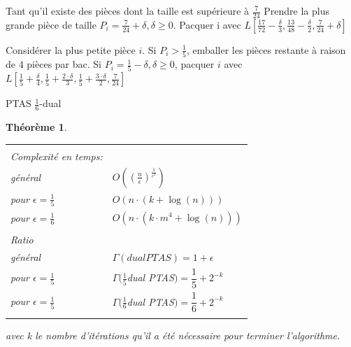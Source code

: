 \documentclass[a4paper,12pt]{report}
\theoremstyle{plain}				%
\newtheorem{theoreme}{Théorème}	%
\theoremstyle{definition}				%
\begin{document}
\begin{algorithm}[H]
Tant qu'il existe des pièces dont la taille est supérieure à $\frac{7}{24}$
Prendre la plus grande pièce de taille $P_i = \frac{7}{24}+\delta, \delta \geq 0$.
Pacquer i avec
$L[\frac{17}{72}-\frac{\delta}{3},
   \frac{13}{48}-\frac{\delta}{2},
   \frac{7}{24}+\delta]$

Considérer la plus petite pièce $i$.
Si $P_i>\frac{1}{5}$, emballer les pièces restante à raison de $4$ pièces par bac.
Si $P_i=\frac{1}{5}-\delta, \delta \geq 0$, pacquer $i$ avec
$L[\frac{1}{5}+\frac{\delta}{4},
   \frac{1}{5}+\frac{2 \cdot \delta}{3},
   \frac{1}{5}+\frac{3 \cdot \delta}{2},
   \frac{7}{24}]$

\BlankLine %



\caption{PTAS $\frac{1}{6}$-dual}
\label{algo:PTASDual1_6}
\end{algorithm}

\bigskip

\begin{theoreme}
\begin{flushleft}
\begin{tabular}{|p{8cm}p{6cm}|}
\hline
& \\
Complexité en temps:& \\
général&
	$ O(( \frac{n}{\epsilon})^\frac{1}{\epsilon ^ 2})$\\
pour $ \epsilon = \frac{1}{5}$ &
	$O(n \cdot (k + \log(n)))$ \\
pour $ \epsilon = \frac{1}{6}$ &
	$O(n \cdot (k \cdot m^4 + \log(n)))$

\\	%
& \\
Ratio & \\
général &
	$\Gamma(dual PTAS) = 1 + \epsilon$\\

pour $ \epsilon = \frac{1}{5}$ &
	$\Gamma(\frac{1}{5}$dual PTAS$) = \dfrac{1}{5} + 2^{-k}$\\

pour $ \epsilon = \frac{1}{5}$ &
	$\Gamma(\frac{1}{6}$dual PTAS$) = \dfrac{1}{6} + 2^{-k}$
\\
& \\
\hline
\end{tabular}
\end{flushleft}
avec k le nombre d'itérations qu'il a été nécessaire pour terminer l'algorithme.
\end{theoreme}
\end{document}
